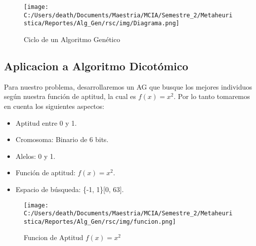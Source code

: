 \begin{figure}[H]
    \centering
    \texttt{[image: C:/Users/death/Documents/Maestria/MCIA/Semestre\_2/Metaheuristica/Reportes/Alg\_Gen/rsc/img/Diagrama.png]}
    \caption{Ciclo de un Algoritmo Genético}\label{diag}
\end{figure}

\subsection{Aplicacion a Algoritmo Dicotómico}

Para nuestro problema, desarrollaremos un AG que busque los mejores individuos según nuestra función de aptitud, la cual es $f(x) = x^2$.
Por lo tanto tomaremos en cuenta los siguientes aspectos:

\begin{itemize}
    \item Aptitud entre 0 y 1.
    \item Cromosoma: Binario de 6 bits.
    \item Alelos: 0 y 1.
    \item Función de aptitud: $f(x) = x^2$.
    \item Espacio de búsqueda: \{-1, 1\}[0, 63].
\end{itemize}

\begin{figure} [H]
    \centering
    \texttt{[image: C:/Users/death/Documents/Maestria/MCIA/Semestre\_2/Metaheuristica/Reportes/Alg\_Gen/rsc/img/funcion.png]}
    \caption{Funcion de Aptitud $f(x) = x^2$}\label{funcion}
\end{figure}